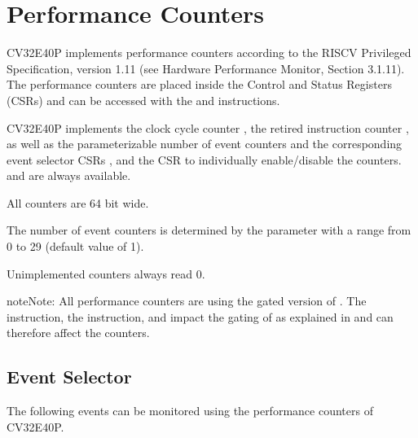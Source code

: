 \documentclass[letterpaper,10pt,english]{sphinxmanual}
\begin{document}
\sphinxstepscope


\chapter{Performance Counters}
\label{\detokenize{perf_counters:performance-counters}}\label{\detokenize{perf_counters:id1}}\label{\detokenize{perf_counters::doc}}
\sphinxAtStartPar
CV32E40P implements performance counters according to the RISC\sphinxhyphen{}V Privileged Specification, version 1.11 (see Hardware Performance Monitor, Section 3.1.11).
The performance counters are placed inside the Control and Status Registers (CSRs) and can be accessed with the  and  instructions.

\sphinxAtStartPar
CV32E40P implements the clock cycle counter , the retired instruction counter , as well as the parameterizable number of event counters
 \sphinxhyphen{}  and the corresponding event selector CSRs  \sphinxhyphen{} , and the  CSR to individually enable/disable the counters.
 and  are always available.

\sphinxAtStartPar
All counters are 64 bit wide.

\sphinxAtStartPar
The number of event counters is determined by the parameter  with a range from 0 to 29 (default value of 1).

\sphinxAtStartPar
Unimplemented counters always read 0.

\begin{sphinxadmonition}{note}{Note:}
\sphinxAtStartPar
All performance counters are using the gated version of . The  instruction, the
 instruction, and  impact the gating of  as explained
in {\hyperref[\detokenize{sleep:sleep-unit}]{}} and can therefore affect the counters.
\end{sphinxadmonition}


\section{Event Selector}
\label{\detokenize{perf_counters:event-selector}}\label{\detokenize{perf_counters:id2}}
\sphinxAtStartPar
The following events can be monitored using the performance counters of CV32E40P.
\end{document}
